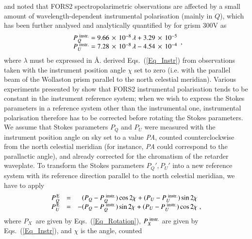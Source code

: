 \documentclass[a4paper]{aa}
\newcommand{\pq}{\ensuremath{P_Q}}
\newcommand{\pu}{\ensuremath{P_U}}
\newcommand{\pqe}{\ensuremath{P_Q^{\rm \,E}}}
\newcommand{\pue}{\ensuremath{P_U^{\rm \,E}}}
\newcommand{\px}{\ensuremath{P_{X}}}
\begin{document}
\citet{Fosetal07} and \citet{Sieetal14} noted that FORS2
spectropolarimetric observations are affected by a small amount of
wavelength-dependent instrumental polarisation (mainly in $Q$), which
has been further analysed and analytically quantified by \citet{Ciketal17}
for grism 300V as
\begin{equation}
  \begin{array}{rcl}
    \pq^{\rm \ instr.} = 9.66\,\times\,10^{-8}\,\lambda + 3.29\,\times\,10^{-5}\\
    \pu^{\rm \ instr.} = 7.28\,\times\,10^{-8}\,\lambda - 4.54\,\times\,10^{-4}\\
  \end{array}
\label{Eq_Instr}
,\end{equation}
where $\lambda$ must be expressed in \AA. \citet{Ciketal17} derived Eqs.~(\ref{Eq_Instr})
from observations taken with the instrument position angle $\chi$ set to zero
(i.e. with the parallel beam of the Wollaston prism parallel to the
north celestial meridian). Various experiments presented
by \citet{Sieetal14} show that FORS2 instrumental polarisation tends to be constant
in the instrument reference system; when we wish to express the Stokes
parameters in a reference system other than the instrumental one, instrumental
polarisation therefore has to be corrected before rotating the Stokes
parameters. We assume that Stokes parameters $\pq$ and $\pu$
were measured
with the instrument position angle on sky set to a value {\it PA}, counted counterclockwise
from the north celestial meridian (for instance, {\it PA} could correspond to
the parallactic angle), and already corrected for the
chromatism of the retarder waveplate. To transform the Stokes parameters $\pq',\pu'$
into a new reference system with its reference direction parallel to the north celestial
meridian, we have to apply
\begin{equation}
  \begin{array}{rcl}
    \pqe &=& \phantom{-}(\pq - \pq^{\rm \ instr.})\cos 2\chi + (\pu - \pu^{\rm \ instr.})\sin 2\chi \\
    \pue &=&          - (\pq - \pq^{\rm \ instr.})\sin 2\chi + (\pu - \pu^{\rm \ instr.})\cos 2\chi \; ,\\
  \end{array}
  \label{Eq_Corr}
\end{equation}
where \px\ are given by Eqs.~(\ref{Eq_Rotation}), $\px^{\rm \ instr.}$ are
given by Eqs.~(\ref{Eq_Instr}), and $\chi$ is the angle, counted
\end{document}
